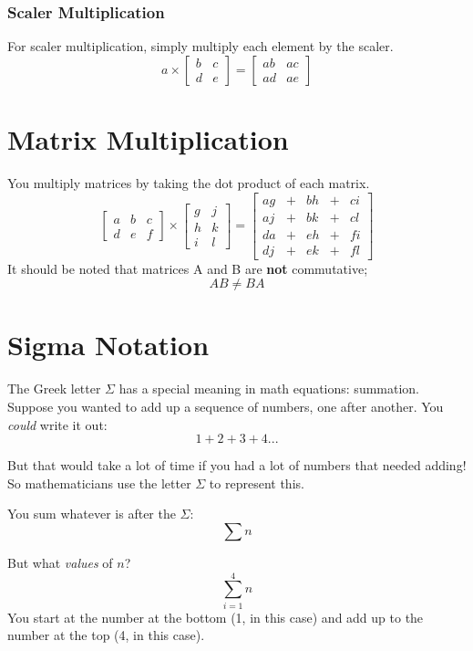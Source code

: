\documentclass{article}
\begin{document}
\subsubsection{Scaler Multiplication}
	For scaler multiplication, simply multiply each element by the scaler.
	$$
	a
	\times
	\begin{bmatrix}
		b & c \\
		d & e
	\end{bmatrix}
	= 
	\begin{bmatrix}
		ab & ac \\
		ad & ae
	\end{bmatrix}
	$$

\section{Matrix Multiplication}
You multiply matrices by taking the dot product of each matrix. 
$$
\begin{bmatrix}
	a & b & c \\
	d & e & f
\end{bmatrix}
\times
\begin{bmatrix}
	g & j \\
	h & k \\
	i & l
\end{bmatrix}
= 
\begin{bmatrix}
ag & + & bh & + & ci \\
aj & + & bk & + & cl \\
da & + & eh & + & fi \\
dj & + & ek & + & fl
\end{bmatrix}
$$
It should be noted that matrices A and B are \textbf{not} commutative; 
$$AB \ne BA$$

\section{Sigma Notation}
The Greek letter $\Sigma$ has a special meaning in math equations: summation. 
Suppose you wanted to add up a sequence of numbers, one after another. You \textit{could} write it out:
$$1 + 2 + 3 + 4...$$

But that would take a lot of time if you had a lot of numbers that needed adding! So mathematicians use the letter $\Sigma$ to represent this. 

You sum whatever is after the $\Sigma$:
$$\sum n$$

But what \textit{values} of $n$?
$$\sum_{i=1}^{4} n$$
You start at the number at the bottom (1, in this case) and add up to the number at the top (4, in this case).
\end{document}
